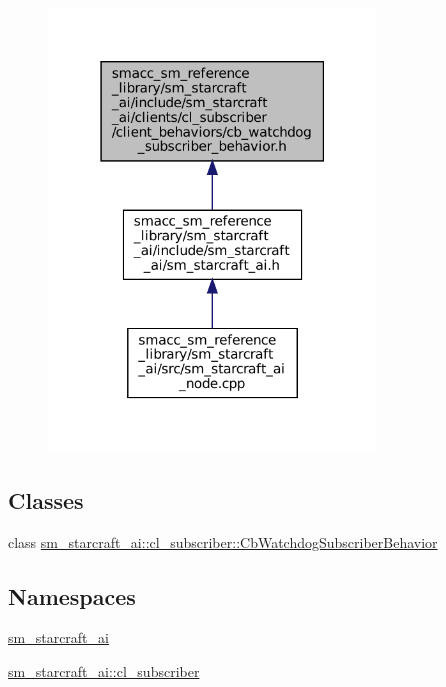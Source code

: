 \begin{figure}[H]
\begin{center}
\leavevmode
\includegraphics[width=247pt]{sm__starcraft__ai_2include_2sm__starcraft__ai_2clients_2cl__subscriber_2client__behaviors_2cb__w1c006e7bf74b225dd0708db7426266b4}
\end{center}
\end{figure}
\subsection*{Classes}
\begin{DoxyCompactItemize}
\item 
class \hyperlink{classsm__starcraft__ai_1_1cl__subscriber_1_1CbWatchdogSubscriberBehavior}{sm\+\_\+starcraft\+\_\+ai\+::cl\+\_\+subscriber\+::\+Cb\+Watchdog\+Subscriber\+Behavior}
\end{DoxyCompactItemize}
\subsection*{Namespaces}
\begin{DoxyCompactItemize}
\item 
 \hyperlink{namespacesm__starcraft__ai}{sm\+\_\+starcraft\+\_\+ai}
\item 
 \hyperlink{namespacesm__starcraft__ai_1_1cl__subscriber}{sm\+\_\+starcraft\+\_\+ai\+::cl\+\_\+subscriber}
\end{DoxyCompactItemize}
